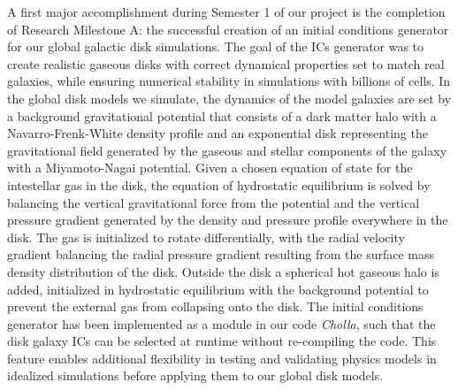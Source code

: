 \documentclass[11pt,letterpaper,english]{article}
\begin{document}
A first major accomplishment during Semester 1 of our project is the completion of Research Milestone A: the successful creation of an initial conditions generator for our global galactic disk simulations. The goal of the ICs generator was to 
create realistic gaseous disks with correct dynamical properties set to match real galaxies, while
ensuring numerical stability in simulations with billions of cells.  
In the global disk models we simulate, the dynamics of the model galaxies are set by a background
gravitational potential that consists of a dark matter halo with a Navarro-Frenk-White density profile and
an exponential disk representing the gravitational field generated by the gaseous and stellar components of the galaxy with a Miyamoto-Nagai potential. Given a chosen equation of state for the intestellar gas
in the disk, the equation of hydrostatic equilibrium is solved by balancing the vertical gravitational force from the potential and the vertical pressure gradient generated by the density and pressure profile everywhere in the disk. The gas is initialized to rotate differentially, with the radial velocity
gradient balancing the radial pressure gradient resulting from the surface mass density distribution
of the disk. Outside the disk a spherical hot gaseous halo is added, initialized in 
hydrostatic equilibrium with the
background potential to prevent the external gas from collapsing onto the disk. The initial conditions
generator has been implemented as a module in our code \textit{Cholla}, such that the disk galaxy ICs
can be selected at runtime without re-compiling the code. This feature enables additional flexibility
in testing and validating physics models in idealized simulations before applying them to our global
disk models.
~\\~\\
\end{document}
